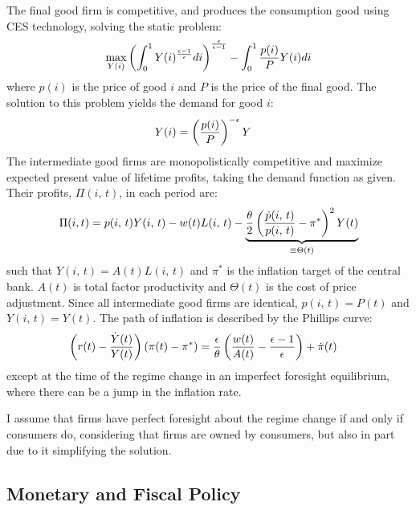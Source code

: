 \documentclass[11pt]{article}
\begin{document}
The final good firm is competitive, and produces the consumption good using CES technology, solving the static problem:
\begin{align*}
    \max_{Y(i)} \bp{\int_{0}^{1}Y(i)^{\frac{\epsilon - 1}{\epsilon}}di}^{\frac{\epsilon}{\epsilon - 1}} - \int_{0}^{1}\frac{p(i)}{P}Y(i)di
\end{align*}
where $p(i)$ is the price of good $i$ and $P$ is the price of the final good. The solution to this problem yields the demand for good $i$:
\begin{align*}
    Y(i) &= \left( \frac{p(i)}{P} \right)^{-\epsilon}Y
\end{align*}
The intermediate good firms are monopolistically competitive and maximize expected present value of lifetime profits, taking the demand function as given. Their profits, $\Pi(i,\,t)$, in each period are:
\begin{align*}
    \Pi(i, t) = p(i,\,t)Y(i,\,t) - w(t)L(i,\,t) - \underbrace{\frac{\theta}{2}\left( \frac{\dot{p}(i,\,t)}{p(i,\,t)} - \pi^* \right)^2Y(t)}_{\equiv \Theta(t)}
\end{align*}
such that $Y(i,\,t) = A(t)L(i,\,t)$ and $\pi^*$ is the inflation target of the central bank. $A(t)$ is total factor productivity and $\Theta(t)$ is the cost of price adjustment. Since all intermediate good firms are identical, $p(i,\,t) = P(t)$ and $Y(i,\,t) = Y(t)$. The path of inflation is described by the Phillips curve:
\begin{align*}
    \left( r(t) - \frac{\dot{Y}(t)}{Y(t)} \right)(\pi(t) - \pi^*) &= \frac{\epsilon}{\theta}\left( \frac{w(t)}{A(t)} - \frac{\epsilon - 1}{\epsilon} \right) + \dot{\pi}(t)
\end{align*}
except at the time of the regime change in an imperfect foresight equilibrium, where there can be a jump in the inflation rate.

I assume that firms have perfect foresight about the regime change if and only if consumers do, considering that firms are owned by consumers, but also in part due to it simplifying the solution.

\subsection{Monetary and Fiscal Policy}
\end{document}
